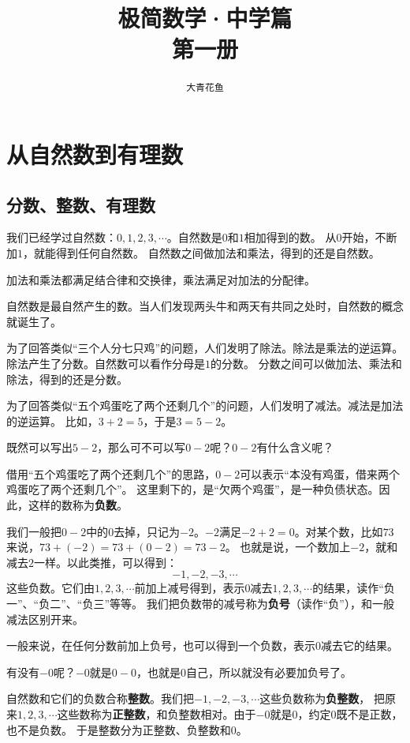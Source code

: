 \documentclass[12pt,UTF8]{ctexbook}
\title{\zihao{0} \bfseries 极简数学·中学篇 \\ 第一册}
\author{\zihao{2} \texttt{大青花鱼}}
\date{}
\begin{document}
\maketitle
\tableofcontents
\newpage

\chapter{从自然数到有理数}

\section{分数、整数、有理数}
我们已经学过自然数：$0,1,2,3,\cdots$。自然数是$0$和$1$相加得到的数。
从$0$开始，不断加$1$，就能得到任何自然数。
自然数之间做加法和乘法，得到的还是自然数。

加法和乘法都满足结合律和交换律，乘法满足对加法的分配律。

自然数是最自然产生的数。当人们发现两头牛和两天有共同之处时，自然数的概念就诞生了。

为了回答类似“三个人分七只鸡”的问题，人们发明了除法。除法是乘法的逆运算。除法产生了分数。自然数可以看作分母是$1$的分数。
分数之间可以做加法、乘法和除法，得到的还是分数。

为了回答类似“五个鸡蛋吃了两个还剩几个”的问题，人们发明了减法。减法是加法的逆运算。
比如，$3+2=5$，于是$3=5 - 2$。

既然可以写出$5-2$，那么可不可以写$0-2$呢？$0-2$有什么含义呢？

借用“五个鸡蛋吃了两个还剩几个”的思路，$0-2$可以表示“本没有鸡蛋，借来两个鸡蛋吃了两个还剩几个”。
这里剩下的，是“欠两个鸡蛋”，是一种负债状态。因此，这样的数称为\textbf{负数}。

我们一般把$0-2$中的$0$去掉，只记为$-2$。$-2$满足$-2+2=0$。对某个数，比如$73$来说，$73+(-2)=73+(0-2)=73-2$。
也就是说，一个数加上$-2$，就和减去$2$一样。以此类推，可以得到：
$$ -1, -2, -3, \cdots $$
这些负数。它们由$1,2,3,\cdots$前加上减号得到，表示$0$减去$1,2,3,\cdots$的结果，读作“负一”、“负二”、“负三”等等。
我们把负数带的减号称为\textbf{负号}（读作“负”），和一般减法区别开来。

一般来说，在任何分数前加上负号，也可以得到一个负数，表示$0$减去它的结果。

有没有$-0$呢？$-0$就是$0-0$，也就是$0$自己，所以就没有必要加负号了。

自然数和它们的负数合称\textbf{整数}。我们把$-1, -2, -3, \cdots$这些负数称为\textbf{负整数}，
把原来$1,2,3,\cdots$这些数称为\textbf{正整数}，和负整数相对。由于$-0$就是$0$，约定$0$既不是正数，也不是负数。
于是整数分为正整数、负整数和$0$。
\end{document}
